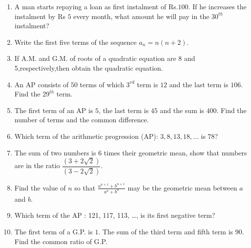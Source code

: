 \begin{enumerate}[label=\thesection.\arabic*,ref=\thesection.\theenumi]
 \item
A man starts repaying a loan as first instalment of Rs.$100$. If he increases the
instalment by Rs $5$ every month, what amount he will pay in the $30^{th}$ instalment? \\
\solution

\newpage

\item 
Write the first five terms of the sequence $a_n = n(n+2)$. \\
\solution

\newpage
\item If A.M. and G.M. of roots of a quadratic equation are 8 and 5,respectively,then obtain the quadratic equation.
\solution

\pagebreak

\item An AP consists of $50$ terms of which $3^{rd}$ term is $12$ and the last term is $106$. Find the $29^{th}$ term.\\
\solution 

\pagebreak

\item The first term of an AP is $5$, the last term is $45$ and the sum is $400$. Find the number of terms and the common difference.\\
\solution

\pagebreak

\item Which term of the arithmetic progression (AP): \(3, 8, 13, 18, \ldots\) is \(78\)?\\
\solution

\pagebreak

\item The sum of two numbers is $6$ times their geometric mean, show that numbers are in the ratio $\dfrac{(3+2\sqrt{2})}{(3-2\sqrt{2})}$. 
\solution

\pagebreak

\item Find the value of $n$ so that $\frac{a^{n+1} + b^{n+1}}{a^{n}+b^{n}}$ may be the geometric mean between $a$ and $b$. \\
\solution

\pagebreak

\item Which term of the AP : 121, 117, 113, \ldots, is its first negative term?\\
\solution
\pagebreak

\item The first term of a G.P. is $1$. The sum of the third term and fifth term is $90$. Find the common ratio of G.P.\\
\solution
\pagebreak


\end{enumerate}
